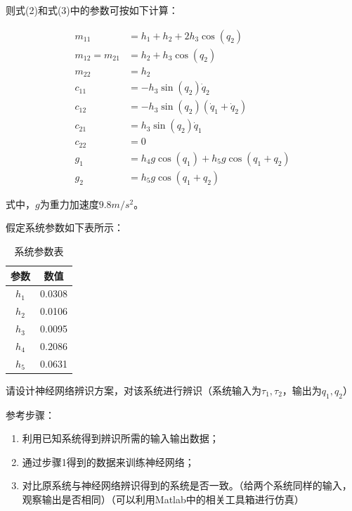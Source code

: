 \documentclass[12pt,a4paper,UTF8]{article}
\begin{document}
则式(2)和式(3)中的参数可按如下计算：

\begin{equation}
\begin{aligned}
m_{11} &= h_1 + h_2 + 2h_3 \cos(q_2) \\
m_{12} = m_{21} &= h_2 + h_3 \cos(q_2) \\
m_{22} &= h_2 \\
c_{11} &= -h_3 \sin(q_2) \dot{q}_2 \\
c_{12} &= -h_3 \sin(q_2) (\dot{q}_1 + \dot{q}_2) \\
c_{21} &= h_3 \sin(q_2) \dot{q}_1\\
c_{22} &= 0 \\
g_1 &= h_4 g \cos(q_1) + h_5 g \cos(q_1 + q_2) \\
g_2 &= h_5 g \cos(q_1 + q_2) 
\end{aligned}
\end{equation}

式中，$g$为重力加速度$9.8m/s^2$。

假定系统参数如下表所示：

\begin{table}[htbp]
\centering
\begin{tabular}{|c|c|}
\hline
参数 & 数值 \\
\hline
$h_1$ & 0.0308 \\
$h_2$ & 0.0106 \\
$h_3$ & 0.0095 \\
$h_4$ & 0.2086 \\
$h_5$ & 0.0631 \\
\hline
\end{tabular}
\caption{系统参数表}
\label{tab:parameters}
\end{table}


\begin{problem}
请设计神经网络辨识方案，对该系统进行辨识（系统输入为$\tau_1, \tau_2$，输出为$q_1, q_2$）

参考步骤：
\begin{enumerate}
    \item 利用已知系统得到辨识所需的输入输出数据；
    \item 通过步骤1得到的数据来训练神经网络；
    \item 对比原系统与神经网络辨识得到的系统是否一致。（给两个系统同样的输入，观察输出是否相同）（可以利用Matlab中的相关工具箱进行仿真）
\end{enumerate}
    
\end{problem}
\end{document}
